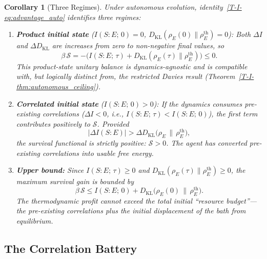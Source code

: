 \documentclass[12pt,a4paper,openany]{book}
\newtheorem{corollary}[theorem]{Corollary}
\begin{document}
\begin{corollary}[Three Regimes]
\label{T-I-cor:three_regimes}
Under autonomous evolution, identity~\eqref{T-I-eq:advantage_auto}
identifies three regimes:
\begin{enumerate}
\item \textbf{Product initial state}
  ($I(S{:}E;\, 0) = 0$,
  $D_{\mathrm{KL}}(\rho_E(0) \| \rho_E^{\mathrm{th}}) = 0$):
  Both $\Delta I$ and $\Delta D_{\mathrm{KL}}$ are increases
  from zero to non-negative final values, so
  \[
  \beta\,\mathcal{S}
  = -\bigl(I(S{:}E;\,\tau)
  + D_{\mathrm{KL}}(\rho_E(\tau) \| \rho_E^{\mathrm{th}})\bigr)
  \leq 0.
  \]
  This product-state unitary balance is dynamics-agnostic and is
  compatible with, but logically distinct from, the restricted Davies
  result (Theorem~\ref{T-I-thm:autonomous_ceiling}).

\item \textbf{Correlated initial state}
  ($I(S{:}E;\, 0) > 0$):
  If the dynamics \emph{consumes} pre-existing correlations
  ($\Delta I < 0$, i.e., $I(S{:}E;\, \tau) < I(S{:}E;\, 0)$),
  the first term contributes \emph{positively} to
  $\mathcal{S}$.
  Provided
  \begin{equation}
  \label{T-I-eq:ceiling_breach}
  |\Delta I(S{:}E)| > \Delta D_{\mathrm{KL}}\!\bigl(\rho_E
  \,\big\|\, \rho_E^{\mathrm{th}}\bigr),
  \end{equation}
  the survival functional is strictly positive:
  $\mathcal{S} > 0$.
  The agent has converted pre-existing correlations into
  usable free energy.

\item \textbf{Upper bound:}
  Since $I(S{:}E;\, \tau) \geq 0$ and
  $D_{\mathrm{KL}}(\rho_E(\tau) \| \rho_E^{\mathrm{th}})
  \geq 0$, the maximum survival gain is bounded by
  \begin{equation}
  \label{T-I-eq:S_upper}
  \beta\,\mathcal{S}
  \leq I(S{:}E;\, 0)
    + D_{\mathrm{KL}}\!\bigl(\rho_E(0) \,\big\|\,
      \rho_E^{\mathrm{th}}\bigr).
  \end{equation}
  The thermodynamic profit cannot exceed the total initial
  ``resource budget''---the pre-existing correlations plus
  the initial displacement of the bath from equilibrium.
\end{enumerate}
\end{corollary}

\subsection{The Correlation Battery}
\end{document}
